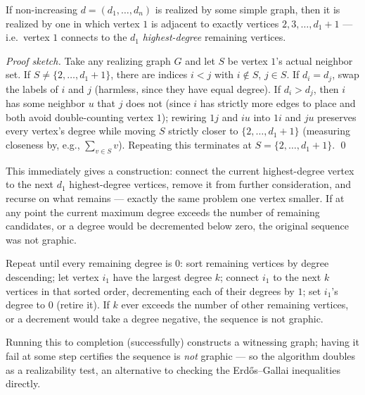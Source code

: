 \documentclass[11pt]{article}
\begin{document}
\begin{theorembox}
If non-increasing $d = (d_1, \ldots, d_n)$ is realized by some simple
graph, then it is realized by one in which vertex $1$ is adjacent to
exactly vertices $2, 3, \ldots, d_1 + 1$ --- i.e.\ vertex $1$ connects to
the $d_1$ \emph{highest-degree} remaining vertices.

\emph{Proof sketch.} Take any realizing graph $G$ and let $S$ be vertex
$1$'s actual neighbor set. If $S \ne \{2, \ldots, d_1+1\}$, there are
indices $i < j$ with $i \notin S$, $j \in S$. If $d_i = d_j$, swap the
labels of $i$ and $j$ (harmless, since they have equal degree). If
$d_i > d_j$, then $i$ has some neighbor $u$ that $j$ does not (since $i$
has strictly more edges to place and both avoid double-counting vertex
$1$); rewiring $1j$ and $iu$ into $1i$ and $ju$ preserves every vertex's
degree while moving $S$ strictly closer to $\{2, \ldots, d_1+1\}$
(measuring closeness by, e.g., $\sum_{v \in S} v$). Repeating this
terminates at $S = \{2, \ldots, d_1+1\}$. \qed
\end{theorembox}

This immediately gives a construction: connect the current
highest-degree vertex to the next $d_1$ highest-degree vertices, remove it
from further consideration, and recurse on what remains --- exactly the
same problem one vertex smaller. If at any point the current maximum
degree exceeds the number of remaining candidates, or a degree would be
decremented below zero, the original sequence was not graphic.

\begin{definitionbox}
Repeat until every remaining degree is $0$: sort remaining vertices by
degree descending; let vertex $i_1$ have the largest degree $k$; connect
$i_1$ to the next $k$ vertices in that sorted order, decrementing each of
their degrees by $1$; set $i_1$'s degree to $0$ (retire it). If $k$ ever
exceeds the number of other remaining vertices, or a decrement would take
a degree negative, the sequence is not graphic.
\end{definitionbox}

Running this to completion (successfully) constructs a witnessing graph;
having it fail at some step certifies the sequence is \emph{not} graphic
--- so the algorithm doubles as a realizability test, an alternative to
checking the Erd\H{o}s--Gallai inequalities directly.
\end{document}
